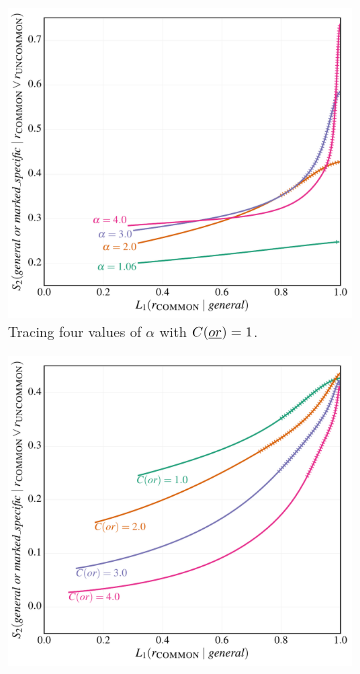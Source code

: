 \documentclass[12pt,twoside]{article}
\newcommand{\word}[1]{\emph{#1}}
\newcommand{\Costs}{C}
\renewcommand{\_}{\textbf{\textunderscore\hspace{-4pt}\textunderscore\hspace{-3pt}\textunderscore\hspace{-4pt}\textunderscore}\hspace{0.5pt}}			%
\begin{document}
\begin{figure}[tp]
  \centering
  \begin{subfigure}{0.48\textwidth}
    \includegraphics[width=1\textwidth]{fig/I-implicature-simulation-alphas} 
    \caption{Tracing four values of $\alpha$ with $\Costs(\word{or}) =1$.}\label{fig:isims:alphas}
  \end{subfigure}
  \hfill
  \begin{subfigure}{0.48\textwidth}
    \includegraphics[width=1\textwidth]{fig/I-implicature-simulation-or} 

\end{subfigure}
\end{figure}
\end{document}
